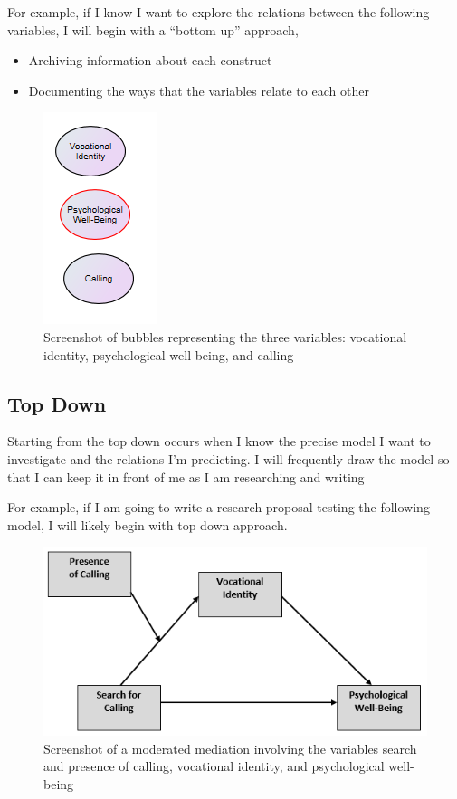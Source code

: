 \documentclass[
  english,
]{book}
\providecommand{\tightlist}{%
  \setlength{\itemsep}{0pt}\setlength{\parskip}{0pt}}
\begin{document}
For example, if I know I want to explore the relations between the following variables, I will begin with a ``bottom up'' approach,

\begin{itemize}
\tightlist
\item
  Archiving information about each construct
\item
  Documenting the ways that the variables relate to each other
\end{itemize}

\begin{figure}
\centering
\includegraphics{images/Excel/TopDown.png}
\caption{Screenshot of bubbles representing the three variables: vocational identity, psychological well-being, and calling}
\end{figure}

\hypertarget{top-down}{%
\subsection{Top Down}\label{top-down}}

Starting from the top down occurs when I know the precise model I want to investigate and the relations I'm predicting. I will frequently draw the model so that I can keep it in front of me as I am researching and writing

For example, if I am going to write a research proposal testing the following model, I will likely begin with top down approach.

\begin{figure}
\centering
\includegraphics{images/Excel/TopDown2.png}
\caption{Screenshot of a moderated mediation involving the variables search and presence of calling, vocational identity, and psychological well-being}
\end{figure}
\end{document}
